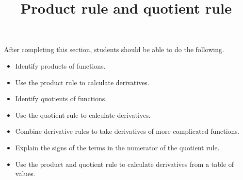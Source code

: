 \documentclass{ximera}
\title{Product rule and quotient rule}
\begin{document}
\begin{abstract}
\end{abstract}

\maketitle

\begin{sectionOutcomes}

After completing this section, students should be able to do the following.

\begin{itemize}
	\item Identify products of functions.
	\item Use the product rule to calculate derivatives.
	\item Identify quotients of functions.
	\item Use the quotient rule to calculate derivatives.
	\item Combine derivative rules to take derivatives of more complicated functions.
        \item Explain the signs of the terms in the numerator of the quotient rule.
	\item Use the product and quotient rule to calculate derivatives from a table of values.
\end{itemize}

\end{sectionOutcomes}
\end{document}

